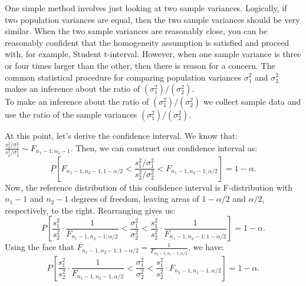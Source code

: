 One simple method involves just looking at two sample variances. Logically, if two population variances are equal, then the two sample variances should be very similar. When the two sample variances are reasonably close, you can be reasonably conﬁdent that the homogeneity assumption is satisﬁed and proceed with, for example, Student t-interval. However, when one sample variance is three or four times larger than the other, then there is reason for a concern. The common statistical procedure for comparing population variances $\sigma_1^2$ and $\sigma_2^2$ makes an inference about the ratio of $(\sigma_1^2)/(\sigma_2^2)$.\\

To make an inference about the ratio of $(\sigma_1^2)/(\sigma_2^2)$ we collect sample data and use the ratio of the sample variances $(\sigma_1^2)/(\sigma_2^2)$.

At this point, let's derive the confidence interval. We know that: $\frac{s_1^2/\sigma_1^2}{s_2^2/\sigma_2^2} \sim F_{n_1-1, n_2 -1}$. Then, we can construct our confidence interval as:
	\[P[F_{n_1-1, n_2 -1; 1-\alpha/2} < \frac{s_1^2/\sigma_1^2}{s_2^2/\sigma_2^2} < F_{n_1-1, n_2 -1; \alpha/2}]  = 1 -\alpha.\]
Now, the reference distribution of this confidence interval is F-distribution with $n_1 - 1$ and $n_2 -1$ degrees of freedom, leaving areas of $1 - \alpha/2$ and $\alpha/2$, respectively, to the right. Rearranging gives us:
	\[P[\frac{s_1^2}{s_2^2} \cdot \frac{1}{F_{n_1-1, n_2 -1; \alpha/2}} < \frac{\sigma_1^2}{\sigma_2^2} < \frac{s_1^2}{s_2^2} \cdot \frac{1}{F_{n_1-1, n_2 -1; 1-\alpha/2}}] = 1 -\alpha.\]
Using the face that $F_{n_1-1,n_2-1; 1 - \alpha/2} = \frac{1}{F_{n_2-1,n_1-1; \alpha/2}}$, we have:
	\[ P[\frac{s_1^2}{s_2^2} \cdot \frac{1}{F_{n_1-1, n_2-1, \alpha/2}} < \frac{\sigma_1^2}{\sigma_2^2} < \frac{s_1^2}{s_2^2} \cdot F_{n_2-1, n_1 - 1, \alpha/2}] = 1- \alpha.\]








